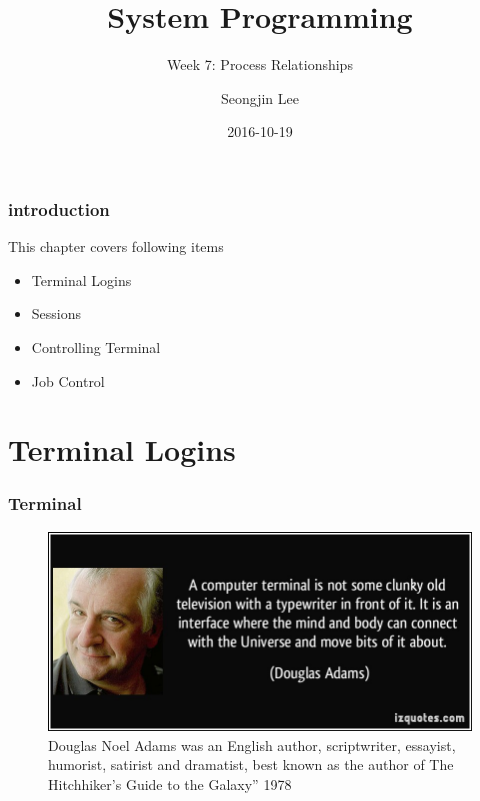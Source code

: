\documentclass[newPxFont,sthlmFooter,nooffset]{beamer}
\title{System Programming}
\subtitle{Week 7: Process Relationships}
\author[SJL]{Seongjin Lee}
\institute{\href{mailto:insight@hanyang.ac.kr}{insight@hanyang.ac.kr}\\\url{http://esos.hanyang.ac.kr}\\Esos Lab. Hanyang University}
\date{2016-10-19}
\begin{document}
\frame[plain]{\titlepage} 






\begin{frame}[t]
  \frametitle{introduction}
This chapter covers following items
  \begin{itemize}
  \item Terminal Logins
  \item Sessions
  \item Controlling Terminal
  \item Job Control
  \end{itemize}

\end{frame}



\section{Terminal Logins}

\begin{frame}[t]
  \frametitle{Terminal}
  \begin{figure}[h]
    \centering
    \includegraphics[width=0.8\linewidth]{figure/quote-a-computer-terminal-is-not-some-clunky-old-television-with-a-typewriter-in-front-of-it-it-is-an-douglas-adams-296711.jpg}
    \caption{Douglas Noel Adams was an English author, scriptwriter, essayist, humorist, satirist and dramatist, best known as the author of The Hitchhiker's Guide to the Galaxy'' 1978}
  \end{figure}
\end{frame}
\end{document}
